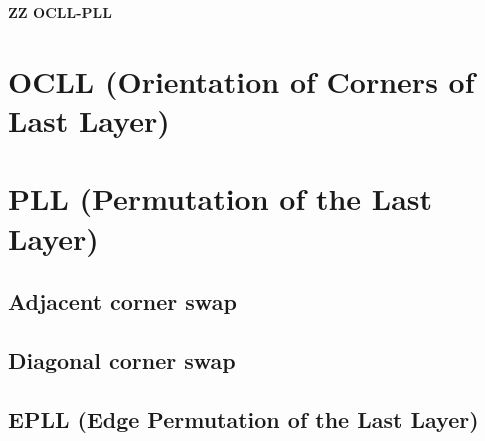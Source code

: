 \documentclass[landscape,a4paper]{article}
\begin{document}
\begin{center}
	{\Huge{\textbf{ZZ OCLL-PLL}}}
\end{center}

\begin{multicols}{2}
\section{OCLL (Orientation of Corners of Last Layer)}



\section{PLL (Permutation of the Last Layer)}

\subsection{Adjacent corner swap}



\subsection{Diagonal corner swap}



\subsection{EPLL (Edge Permutation of the Last Layer)}



\end{multicols}
\end{document}
